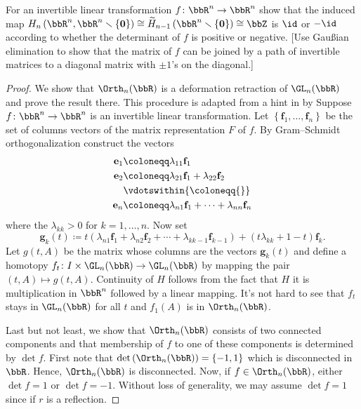 \begin{problem}[Hatcher {\S}2.2, Ex.\@ 7]
For an invertible linear transformation $f\colon\bbR^n\to\bbR^n$ show that
the induced map
$H_n\left(\bbR^n,\bbR^n\smallsetminus\{\mathbf{0}\}\right)\cong\widetilde
H_{n-1}\left(\bbR^n\smallsetminus\{\mathbf{0}\}\right)\cong\bbZ$ is $\id$ or $-\id$
according to whether the determinant of $f$ is positive or negative. [Use
Gaußian elimination to show that the matrix of $f$ can be joined by a path
of invertible matrices to a diagonal matrix with $\pm 1$'s on the
diagonal.]
\end{problem}
\begin{proof}
We show that $\Orth_n(\bbR)$ is a deformation retraction of $\GL_n(\bbR)$
and prove the result there. This procedure is adapted from a hint in
\emph{} by  Suppose $f\colon\bbR^n\to\bbR^n$ is
an invertible linear transformation. Let
$\left\{\mathbf{f}_1,\dotsc,\mathbf{f}_n\right\}$ be the set of columns
vectors of the matrix representation $F$ of $f$. By Gram--Schmidt
orthogonalization construct the vectors
\begin{equation}
\label{eq:gram-schmidt-orth}
\begin{aligned}
\mathbf{e}_1&\coloneqq\lambda_{11}\mathbf{f}_1\\
\mathbf{e}_2&\coloneqq\lambda_{21}\mathbf{f}_1+\lambda_{22}\mathbf{f}_2\\
&\vdotswithin{{}\coloneqq{}}\\
\mathbf{e}_n&\coloneqq\lambda_{n1}\mathbf{f}_1+\dotsb+\lambda_{nn}\mathbf{f}_n
\end{aligned}
\end{equation}
where the $\lambda_{kk}>0$ for $k=1,\dotsc,n$. Now set
\begin{equation}
\label{eq:vectors-as-function-of-t}
\mathbf{g}_k(t)\coloneqq
t\left(\lambda_{n1}\mathbf{f}_1+\lambda_{n2}\mathbf{f}_2+\dotsb+\lambda_{kk-1}\mathbf{f}_{k-1}\right)+(t\lambda_{kk}+1-t)\mathbf{f}_k.
\end{equation}
Let $g(t,A)$ be the matrix whose columns are the vectors $\mathbf{g}_k(t)$
and define a homotopy $f_t\colon I\times\GL_n(\bbR)\to\GL_n(\bbR)$ by mapping
the pair $(t,A)\mapsto g(t,A)$. Continuity of $H$ follows from the fact
that $H$ it is multiplication in $\bbR^n$ followed by a linear
mapping. It's not hard to see that $f_t$ stays in $\GL_n(\bbR)$ for all $t$
and $f_1(A)$ is in $\Orth_n(\bbR)$.

Last but not least, we show that $\Orth_n(\bbR)$ consists of two connected
components and that membership of $f$ to one of these components is
determined by $\det f$. First note that
$\det\left(\Orth_n(\bbR)\right)=\{-1,1\}$ which is disconnected in
$\bbR$. Hence, $\Orth_n(\bbR)$ is disconnected. Now, if
$f\in\Orth_n(\bbR)$, either $\det f=1$ or $\det f=-1$. Without loss of
generality, we may assume $\det f=1$ since if $r$ is a reflection.


\end{proof}
